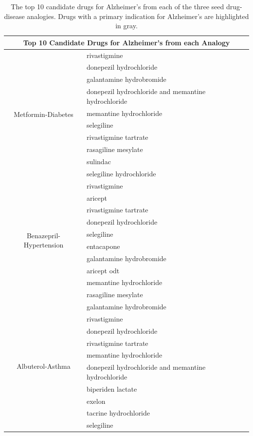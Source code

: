 \documentclass{article}
\newcommand{\lgc}[1]{\cellcolor[gray]{0.85}#1}
\begin{document}
\begin{table}[t!]
\footnotesize
\centering
\caption{The top 10 candidate drugs for Alzheimer's from each of the three seed drug-disease analogies. Drugs with a primary indication for Alzheimer's are highlighted in gray.}
\label{tab:drugs_val_alzh}
\begin{tabular}{c l}
\hline
\multicolumn{2}{c}{Top 10 Candidate Drugs for Alzheimer's from each Analogy} \\
\hline
\multirow{10}{*}{Metformin-Diabetes} & \lgc{rivastigmine} \\
& \lgc{donepezil hydrochloride} \\
& \lgc{galantamine hydrobromide} \\
& \lgc{donepezil hydrochloride and memantine hydrochloride} \\
& \lgc{memantine hydrochloride} \\
& selegiline \\
& \lgc{rivastigmine tartrate} \\
& rasagiline mesylate \\
& sulindac \\
& selegiline hydrochloride \\
\hline
\multirow{10}{*}{Benazepril-Hypertension} & \lgc{rivastigmine} \\
& \lgc{aricept} \\
& \lgc{rivastigmine tartrate} \\
& \lgc{donepezil hydrochloride} \\
& selegiline \\
& entacapone \\
& \lgc{galantamine hydrobromide} \\
& \lgc{aricept odt} \\
& \lgc{memantine hydrochloride} \\
& rasagiline mesylate \\
\hline
\multirow{10}{*}{Albuterol-Asthma} & \lgc{galantamine hydrobromide} \\
& \lgc{rivastigmine} \\
& \lgc{donepezil hydrochloride} \\
& \lgc{rivastigmine tartrate} \\
& \lgc{memantine hydrochloride} \\
& \lgc{donepezil hydrochloride and memantine hydrochloride} \\
& biperiden lactate \\
& \lgc{exelon} \\
& \lgc{tacrine hydrochloride} \\
& selegiline \\
\hline
\end{tabular}
\end{table}
\end{document}
